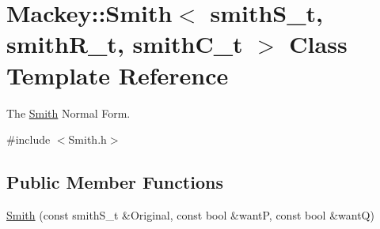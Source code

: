 \hypertarget{classMackey_1_1Smith}{}\section{Mackey\+:\+:Smith$<$ smith\+S\+\_\+t, smith\+R\+\_\+t, smith\+C\+\_\+t $>$ Class Template Reference}
\label{classMackey_1_1Smith}


The \hyperlink{classMackey_1_1Smith}{Smith} Normal Form.  




{\ttfamily \#include $<$Smith.\+h$>$}

\subsection*{Public Member Functions}
\begin{DoxyCompactItemize}
\item 
\hyperlink{classMackey_1_1Smith_a43f657bfa335acf5fe10dd864326c0aa}{Smith} (const smith\+S\+\_\+t \&Original, const bool \&wantP, const bool \&wantQ)
\end{DoxyCompactItemize}
